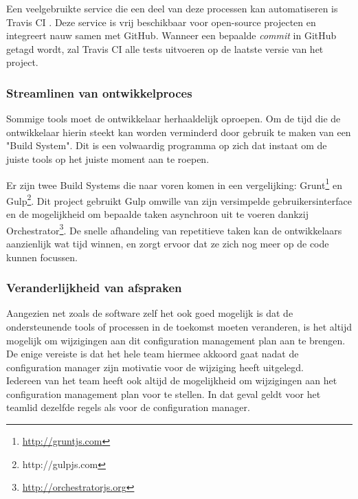 Een veelgebruikte service die een deel van deze processen kan automatiseren is Travis CI \cite{TravisCI}. Deze service is vrij beschikbaar voor open-source projecten en integreert nauw samen met GitHub. Wanneer een bepaalde \textit{commit} in GitHub getagd wordt, zal Travis CI alle tests uitvoeren op de laatste versie van het project.

\subsubsection{Streamlinen van ontwikkelproces}

Sommige tools moet de ontwikkelaar herhaaldelijk oproepen. Om de tijd die de ontwikkelaar hierin steekt kan worden verminderd door gebruik te maken van een "Build System". Dit is een volwaardig programma op zich dat instaat om de juiste tools op het juiste moment aan te roepen.

Er zijn twee Build Systems die naar voren komen in een vergelijking: Grunt\footnote{\url{http://gruntjs.com}} en Gulp\footnote{http://gulpjs.com}. Dit project gebruikt Gulp omwille van zijn versimpelde gebruikersinterface en de mogelijkheid om bepaalde taken asynchroon uit te voeren dankzij Orchestrator\footnote{\url{http://orchestratorjs.org}}. De snelle afhandeling van repetitieve taken kan de ontwikkelaars aanzienlijk wat tijd winnen, en zorgt ervoor dat ze zich nog meer op de code kunnen focussen.

\subsubsection{Veranderlijkheid van afspraken}

Aangezien net zoals de software zelf het ook goed mogelijk is dat de ondersteunende tools of processen in de toekomst moeten veranderen, is het altijd mogelijk om wijzigingen aan dit configuration management plan aan te brengen. De enige vereiste is dat het hele team hiermee akkoord gaat nadat de configuration manager zijn motivatie voor de wijziging heeft uitgelegd. \\

Iedereen van het team heeft ook altijd de mogelijkheid om wijzigingen aan het configuration management plan voor te stellen. In dat geval geldt voor het teamlid dezelfde regels als voor de configuration manager.
